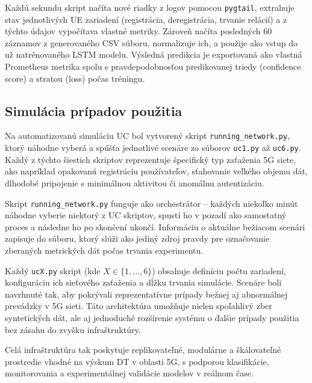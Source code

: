 Každú sekundu skript načíta nové riadky z logov pomocou \texttt{pygtail}, extrahuje stav jednotlivých UE zariadení (registrácia, deregistrácia, trvanie relácií) a z týchto údajov vypočítava vlastné metriky. Zároveň načíta posledných 60 záznamov z generovaného CSV súboru, normalizuje ich, a použije ako vstup do už natrénovaného LSTM modelu. Výsledná predikcia je exportovaná ako vlastná Prometheus metrika spolu s pravdepodobnosťou predikovanej triedy (confidence score) a stratou (loss) počas tréningu.

\subsection*{Simulácia prípadov použitia}

Na automatizovanú simuláciu UC bol vytvorený skript \texttt{running\_network.py}, ktorý náhodne vyberá a spúšťa jednotlivé scenáre zo súborov \texttt{uc1.py} až \texttt{uc6.py}. Každý z týchto šiestich skriptov reprezentuje špecifický typ zaťaženia 5G siete, ako napríklad opakovanú registráciu používateľov, sťahovanie veľkého objemu dát, dlhodobé pripojenie s minimálnou aktivitou či anomálnu autentizáciu.

Skript \texttt{running\_network.py} funguje ako orchestrátor – každých niekoľko minút náhodne vyberie niektorý z UC skriptov, spustí ho v pozadí ako samostatný proces a následne ho po skončení ukončí. Informáciu o aktuálne bežiacom scenári zapisuje do súboru, ktorý slúži ako jediný zdroj pravdy pre označovanie zberaných metrických dát počas trvania experimentu.

Každý \texttt{ucX.py} skript (kde \( X \in \{1, \dots, 6\} \)) obsahuje definíciu počtu zariadení, konfiguráciu ich sieťového zaťaženia a dĺžku trvania simulácie. Scenáre boli navrhnuté tak, aby pokrývali reprezentatívne prípady bežnej aj abnormálnej prevádzky v 5G sieti. Táto architektúra umožňuje nielen spoľahlivý zber syntetických dát, ale aj jednoduché rozšírenie systému o ďalšie prípady použitia bez zásahu do zvyšku infraštruktúry.

Celá infraštruktúra tak poskytuje replikovateľné, modulárne a škálovateľné prostredie vhodné na výskum DT v oblasti 5G, s podporou klasifikácie, monitorovania a experimentálnej validácie modelov v reálnom čase.